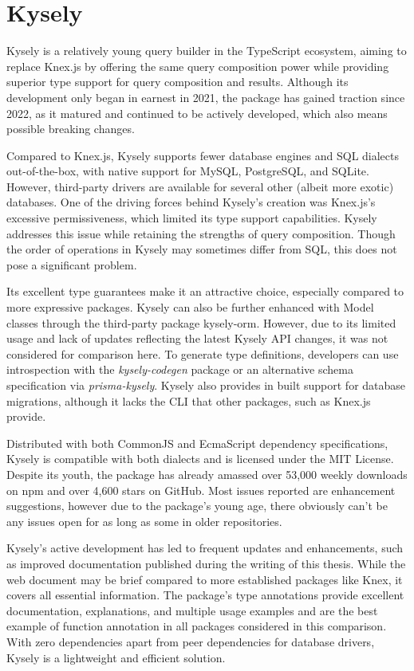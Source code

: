 \section{Kysely}
Kysely is a relatively young query builder in the TypeScript ecosystem, aiming
to replace Knex.js by offering the same query composition power while providing
superior type support for query composition and results. Although its
development only began in earnest in 2021, the package has gained traction since
2022, as it matured and continued to be actively developed, which also means
possible breaking changes.

Compared to Knex.js, Kysely supports fewer database engines and SQL dialects
out-of-the-box, with native support for MySQL, PostgreSQL, and SQLite. However,
third-party drivers are available for several other (albeit more exotic)
databases. One of the driving forces behind Kysely's creation was Knex.js's
excessive permissiveness, which limited its type support capabilities. Kysely
addresses this issue while retaining the strengths of query composition. Though
the order of operations in Kysely may sometimes differ from SQL, this does not
pose a significant problem.

Its excellent type guarantees make it an attractive choice, especially compared
to more expressive packages. Kysely can also be further enhanced with Model
classes through the third-party package kysely-orm. However, due to its limited
usage and lack of updates reflecting the latest Kysely API changes, it was not
considered for comparison here. To generate type definitions, developers can use
introspection with the \textit{kysely-codegen} package or an alternative schema
specification via \textit{prisma-kysely}. Kysely also provides in built support
for database migrations, although it lacks the CLI that other packages, such as
Knex.js provide.

Distributed with both CommonJS and EcmaScript dependency specifications, Kysely
is compatible with both dialects and is licensed under the MIT License. Despite
its youth, the package has already amassed over 53,000 weekly downloads on npm
and over 4,600 stars on GitHub. Most issues reported are enhancement
suggestions, however due to the package's young age, there obviously can't be
any issues open for as long as some in older repositories.

Kysely's active development has led to frequent updates and enhancements, such
as improved documentation published during the writing of this thesis. While the
web document may be brief compared to more established packages like Knex, it
covers all essential information. The package's type annotations provide
excellent documentation, explanations, and multiple usage examples and are the
best example of function annotation in all packages considered in this
comparison. With zero dependencies apart from peer dependencies for database
drivers, Kysely is a lightweight and efficient solution.


